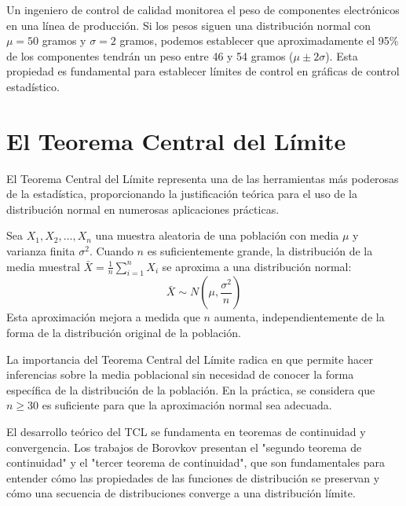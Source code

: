 \begin{example}
Un ingeniero de control de calidad monitorea el peso de componentes electrónicos en una línea de producción. Si los pesos siguen una distribución normal con $\mu = 50$ gramos y $\sigma = 2$ gramos, podemos establecer que aproximadamente el 95\% de los componentes tendrán un peso entre 46 y 54 gramos ($\mu \pm 2\sigma$). Esta propiedad es fundamental para establecer límites de control en gráficas de control estadístico.
\end{example}

\section{El Teorema Central del Límite}

El Teorema Central del Límite representa una de las herramientas más poderosas de la estadística, proporcionando la justificación teórica para el uso de la distribución normal en numerosas aplicaciones prácticas.

\begin{theorem}
Sea $X_1, X_2, \ldots, X_n$ una muestra aleatoria de una población con media $\mu$ y varianza finita $\sigma^2$. Cuando $n$ es suficientemente grande, la distribución de la media muestral $\bar{X} = \frac{1}{n}\sum_{i=1}^{n} X_i$ se aproxima a una distribución normal:
\begin{equation}
\bar{X} \sim N\left(\mu, \frac{\sigma^2}{n}\right)
\end{equation}
Esta aproximación mejora a medida que $n$ aumenta, independientemente de la forma de la distribución original de la población.
\end{theorem}

\begin{remark}
La importancia del Teorema Central del Límite radica en que permite hacer inferencias sobre la media poblacional sin necesidad de conocer la forma específica de la distribución de la población. En la práctica, se considera que $n \geq 30$ es suficiente para que la aproximación normal sea adecuada.

El desarrollo teórico del TCL se fundamenta en teoremas de continuidad y convergencia. Los trabajos de Borovkov presentan el "segundo teorema de continuidad" y el "tercer teorema de continuidad", que son fundamentales para entender cómo las propiedades de las funciones de distribución se preservan y cómo una secuencia de distribuciones converge a una distribución límite.
\end{remark}

